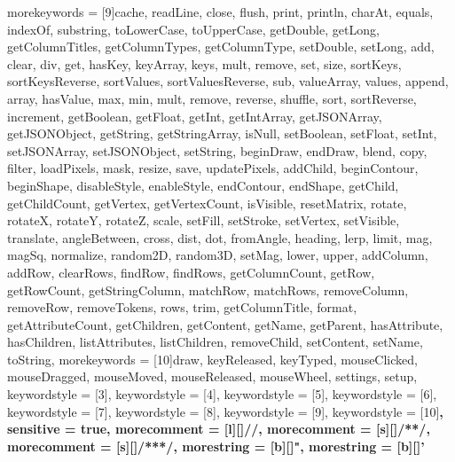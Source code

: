 {	morekeywords = [9]{cache, readLine, close, flush, print, println, charAt, equals, indexOf, substring, toLowerCase, toUpperCase, getDouble, getLong, getColumnTitles, getColumnTypes, getColumnType, setDouble, setLong, add, clear, div, get, hasKey, keyArray, keys, mult, remove, set, size, sortKeys, sortKeysReverse, sortValues, sortValuesReverse, sub, valueArray, values, append, array, hasValue, max, min, mult, remove, reverse, shuffle, sort, sortReverse, increment, getBoolean, getFloat, getInt, getIntArray, getJSONArray, getJSONObject, getString, getStringArray, isNull, setBoolean, setFloat, setInt, setJSONArray, setJSONObject, setString, beginDraw, endDraw, blend, copy, filter, loadPixels, mask, resize, save, updatePixels, addChild, beginContour, beginShape, disableStyle, enableStyle, endContour, endShape, getChild, getChildCount, getVertex, getVertexCount, isVisible, resetMatrix, rotate, rotateX, rotateY, rotateZ, scale, setFill, setStroke, setVertex, setVisible, translate, angleBetween, cross, dist, dot, fromAngle, heading, lerp, limit, mag, magSq, normalize, random2D, random3D, setMag, lower, upper, addColumn, addRow, clearRows, findRow, findRows, getColumnCount, getRow, getRowCount, getStringColumn, matchRow, matchRows, removeColumn, removeRow, removeTokens, rows, trim, getColumnTitle, format, getAttributeCount, getChildren, getContent, getName, getParent, hasAttribute, hasChildren, listAttributes, listChildren, removeChild, setContent, setName, toString},
	morekeywords = [10]{draw, keyReleased, keyTyped, mouseClicked, mouseDragged, mouseMoved, mouseReleased, mouseWheel, settings, setup},
	keywordstyle = [3]\color{bluegreen},
	keywordstyle = [4]\color{lightgreen},
	keywordstyle = [5]\color{magenta},
	keywordstyle = [6]\color{orange},
	keywordstyle = [7]\color{green},
	keywordstyle = [8]\color{function},
	keywordstyle = [9]\color{function},
	keywordstyle = [10]\color{function}\bfseries,
	sensitive = true,
	morecomment = [l][\color{gray}]{//},
	morecomment = [s][\color{gray}]{/*}{*/},
	morecomment = [s][\color{gray}]{/**}{*/},
	morestring = [b][\color{purple}]",
	morestring = [b][\color{purple}]'
}
\renewcommand{\ttdefault}{pcr}


